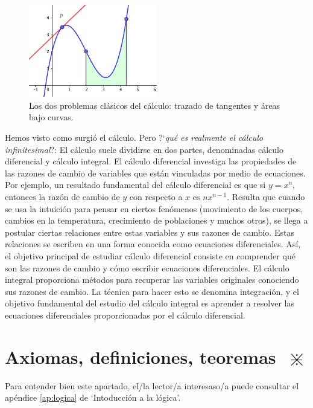		\begin{figure}[H]
			\centering
			\includegraphics[width=0.5\textwidth]{imagenes/imagenes01/T01IM01.png}
			\caption{Los dos problemas clásicos del cálculo: trazado de tangentes y áreas bajo curvas.}
		\end{figure}
		
		Hemos visto como surgió el cálculo. Pero ?`\emph{qué es realmente el cálculo infinitesimal}?: El cálculo suele dividirse en dos partes, denominadas cálculo diferencial y cálculo integral. El cálculo diferencial investiga las propiedades de las razones de cambio de variables que están vinculadas por medio de ecuaciones. Por ejemplo, un resultado fundamental del cálculo diferencial es que si $y = x^n$, entonces la razón de cambio de $y$ con respecto a $x$ es $n x^{n-1}$. Resulta que cuando se usa la intuición para pensar en ciertos fenómenos (movimiento de los cuerpos, cambios en la temperatura, crecimiento de poblaciones y muchos otros), se llega a postular ciertas relaciones entre estas variables y sus razones de cambio. Estas relaciones se escriben en una forma conocida como ecuaciones diferenciales. Así, el objetivo principal de estudiar cálculo diferencial consiste en comprender qué son las razones de cambio y cómo escribir ecuaciones diferenciales. El cálculo integral proporciona métodos para recuperar las variables originales conociendo sus razones de cambio. La técnica para hacer esto se denomina integración, y el objetivo fundamental del estudio del cálculo integral es aprender a resolver las ecuaciones diferenciales proporcionadas por el cálculo diferencial.
	
	
	
	\section{ Axiomas, definiciones, teoremas $\; \divideontimes$}
	
	Para entender bien este apartado, el/la lector/a interesaso/a puede consultar el apéndice \ref{ap:logica} de `Intoducción a la lógica'. 
	
